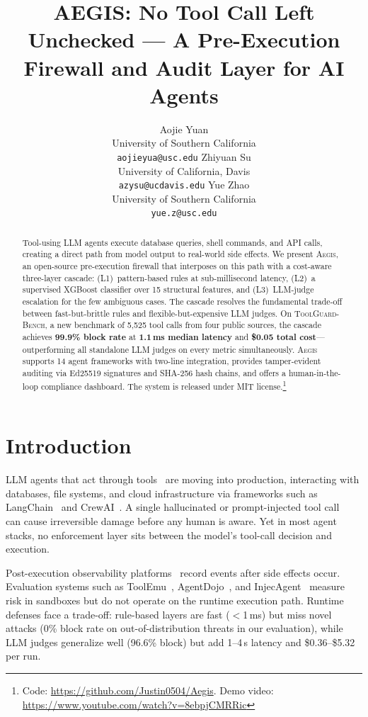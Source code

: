 \documentclass[11pt]{article}
\title{AEGIS: No Tool Call Left Unchecked --- A Pre-Execution Firewall and Audit Layer for AI Agents}
\author{Aojie Yuan \\
  University of Southern California \\
  \texttt{aojieyua@usc.edu} \And
  Zhiyuan Su \\
  University of California, Davis \\
  \texttt{azysu@ucdavis.edu} \And
  Yue Zhao \\
  University of Southern California \\
  \texttt{yue.z@usc.edu}}
\date{}
\newcommand{\system}{\textsc{Aegis}\xspace}
\newcommand{\bench}{\textsc{ToolGuard-Bench}\xspace}
\begin{document}
\maketitle

\begin{abstract}
Tool-using LLM agents execute database queries, shell commands, and API calls, creating a direct path from model output to real-world side effects.
We present \system, an open-source pre-execution firewall that interposes on this path with a cost-aware three-layer cascade: (L1)~pattern-based rules at sub-millisecond latency, (L2)~a supervised XGBoost classifier over 15 structural features, and (L3)~LLM-judge escalation for the few ambiguous cases.
The cascade resolves the fundamental trade-off between fast-but-brittle rules and flexible-but-expensive LLM judges. On \bench, a new benchmark of 5{,}525 tool calls from four public sources, the cascade achieves \textbf{99.9\% block rate} at \textbf{1.1\,ms median latency} and \textbf{\$0.05 total cost}---outperforming all standalone LLM judges on every metric simultaneously.
\system supports 14 agent frameworks with two-line integration, provides tamper-evident auditing via Ed25519 signatures and SHA-256 hash chains, and offers a human-in-the-loop compliance dashboard.
The system is released under MIT license.\footnote{Code: \url{https://github.com/Justin0504/Aegis}. Demo video: \url{https://www.youtube.com/watch?v=8ebpjCMRRic}}
\end{abstract}

\section{Introduction}
\label{sec:intro}

LLM agents that act through tools~\cite{yao2023react,schick2024toolformer} are moving into production, interacting with databases, file systems, and cloud infrastructure via frameworks such as LangChain~\cite{langchain2023} and CrewAI~\cite{crewai2024}.
A single hallucinated or prompt-injected tool call~\cite{greshake2023not} can cause irreversible damage before any human is aware.
Yet in most agent stacks, no enforcement layer sits between the model's tool-call decision and execution.

Post-execution observability platforms~\cite{langfuse2024,arize2024} record events after side effects occur.
Evaluation systems such as ToolEmu~\cite{ruan2024toolemu}, AgentDojo~\cite{debenedetti2024agentsec}, and InjecAgent~\cite{zhan2024injecagent} measure risk in sandboxes but do not operate on the runtime execution path.
Runtime defenses face a trade-off: rule-based layers are fast ($<$1\,ms) but miss novel attacks (0\% block rate on out-of-distribution threats in our evaluation), while LLM judges generalize well (96.6\% block) but add 1--4\,s latency and \$0.36--\$5.32 per run.
\end{document}
